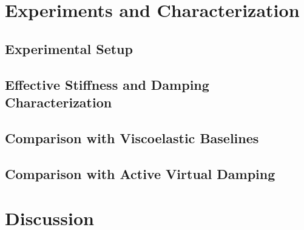 ﻿\documentclass[conference]{IEEEtran}
\begin{document}
\section{Experiments and Characterization}\label{sec:exp}

\subsection{Experimental Setup}

\subsection{Effective Stiffness and Damping Characterization}

\subsection{Comparison with Viscoelastic Baselines}

\subsection{Comparison with Active Virtual Damping}

\section{Discussion}
\end{document}
